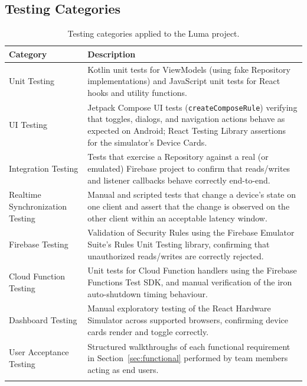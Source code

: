 \documentclass[11pt,a4paper]{article}
\begin{document}
\subsection{Testing Categories}
\begin{longtable}{@{}p{3.2cm}p{10.0cm}@{}}
\toprule
\textbf{Category} & \textbf{Description} \\
\midrule
\endhead
Unit Testing & Kotlin unit tests for ViewModels (using fake Repository implementations) and JavaScript unit tests for React hooks and utility functions. \\
UI Testing & Jetpack Compose UI tests (\texttt{createComposeRule}) verifying that toggles, dialogs, and navigation actions behave as expected on Android; React Testing Library assertions for the simulator's Device Cards. \\
Integration Testing & Tests that exercise a Repository against a real (or emulated) Firebase project to confirm that reads/writes and listener callbacks behave correctly end-to-end. \\
Realtime Synchronization Testing & Manual and scripted tests that change a device's state on one client and assert that the change is observed on the other client within an acceptable latency window. \\
Firebase Testing & Validation of Security Rules using the Firebase Emulator Suite's Rules Unit Testing library, confirming that unauthorized reads/writes are correctly rejected. \\
Cloud Function Testing & Unit tests for Cloud Function handlers using the Firebase Functions Test SDK, and manual verification of the iron auto-shutdown timing behaviour. \\
Dashboard Testing & Manual exploratory testing of the React Hardware Simulator across supported browsers, confirming device cards render and toggle correctly. \\
User Acceptance Testing & Structured walkthroughs of each functional requirement in Section~\ref{sec:functional} performed by team members acting as end users. \\
\bottomrule
\caption{Testing categories applied to the Luma project.}
\label{tab:testing-categories}
\end{longtable}
\end{document}
